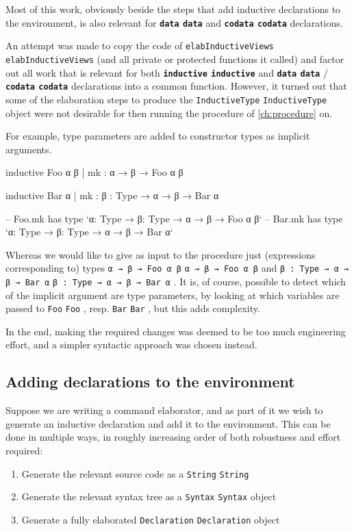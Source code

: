 \documentclass[titlepage]{report}
\newcommand\lean[1]{%
\ifx\leanmode\undefined%
\def\leanmode{1}%
\texttt{\small #1}%
\undef\leanmode%
\else%
\texttt{#1}%
\fi%
}
\newcommand\keyword[1]{{\color{keywordcolor} \textbf{\lean{#1}}}}
\newcommand\inductive{{\keyword{inductive}}}
\newcommand\data{\keyword{data}}
\newcommand\codata{\keyword{codata}}
\begin{document}
Most of this work, obviously beside the steps that add inductive declarations to the environment, is also relevant for \data{} and \codata{} declarations.

An attempt was made to copy the code of \lean{elabInductiveViews} (and all private or protected functions it called) and factor out all work that is relevant for both \inductive{} and \data{}/\codata{} declarations into a common function.
However, it turned out that some of the elaboration steps to produce the \lean{InductiveType} object were not desirable for then running the procedure of \cref{ch:procedure} on.

For example, type parameters are added to constructor types as implicit arguments.
\begin{leancode}
    inductive Foo α β
      | mk : α → β → Foo α β

    inductive Bar α
      | mk : {β : Type} → α → β → Bar α

    -- Foo.mk has type `{α: Type} → {β: Type} → α → β → Foo α β`
    -- Bar.mk has type `{α: Type} → {β: Type} → α → β → Bar α`
\end{leancode}
Whereas we would like to give as input to the procedure just (expressions corresponding to) types \lean{α → β → Foo α β} and \lean{{β : Type} → α → β → Bar α}.
It is, of course, possible to detect which of the implicit argument are type parameters, by looking at which variables are passed to \lean{Foo}, resp. \lean{Bar}, but this adds complexity.

In the end, making the required changes was deemed to be too much engineering effort, and a simpler syntactic approach was chosen instead.



\subsection{Adding declarations to the environment}
Suppose we are writing a command elaborator, and as part of it we wish to generate an inductive declaration and add it to the environment. This can be done in multiple ways, in roughly increasing order of both robustness and effort required:
\begin{enumerate}
    \item Generate the relevant source code as a \lean{String}
    \item Generate the relevant syntax tree as a \lean{Syntax} object
    \item Generate a fully elaborated \lean{Declaration} object
\end{enumerate}
\end{document}
